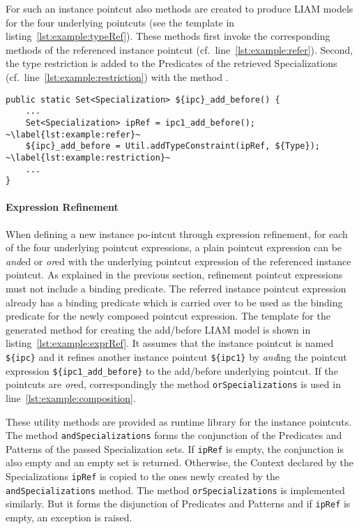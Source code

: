 For such an instance pointcut also methods are created to produce LIAM models for the four underlying pointcuts (see the template in listing~\ref{lst:example:typeRef}).
These methods first invoke the corresponding methods of the referenced instance pointcut (cf.\ line~\ref{lst:example:refer}).
Second, the type restriction is added to the Predicates of the retrieved Specializations (cf.\ line~\ref{lst:example:restriction}) with the method .

\begin{lstlisting}[caption={Template for creating the LIAM model for the type-refined instance pointcut},label={lst:example:typeRef}]
public static Set<Specialization> ${ipc}_add_before() {
	...
	Set<Specialization> ipRef = ipc1_add_before(); ~\label{lst:example:refer}~
	${ipc}_add_before = Util.addTypeConstraint(ipRef, ${Type}); ~\label{lst:example:restriction}~
	...
}
\end{lstlisting}


\paragraph{Expression Refinement}
When defining a new instance po-intcut through expression refinement, for each of the four underlying pointcut expressions, a plain pointcut expression can be \emph{and}ed or \emph{or}ed with the underlying pointcut expression of the referenced instance pointcut. As explained in the previous section, refinement pointcut expressions must not include a binding predicate. The referred instance pointcut expression already has a binding predicate which is carried over to be used as the binding predicate for the newly composed pointcut expression.
The template for the generated method for creating the add/before LIAM model is shown in listing~\ref{lst:example:exprRef}.
It assumes that the instance pointcut is named \lstinline!${ipc}! and it refines another instance pointcut \lstinline!${ipc1}! by \emph{and}ing the pointcut expression \lstinline!${ipc1_add_before}! to the add/before underlying pointcut.
If the pointcuts are \emph{or}ed, correspondingly the method \lstinline!orSpecializations! is used in line~\ref{lst:example:composition}.

These utility methods are provided as runtime library for the instance pointcuts.
The method \lstinline!andSpecializations! forms the conjunction of the Predicates and Patterns of the passed Specialization sets.
If \lstinline!ipRef! is empty, the conjunction is also empty and an empty set is returned.
Otherwise, the Context declared by the Specializations \lstinline!ipRef! is copied to the ones newly created by the \lstinline!andSpecializations! method.
The method \lstinline!orSpecializations! is implemented similarly.
But it forms the disjunction of Predicates and Patterns and if \lstinline!ipRef! is empty, an exception is raised.

